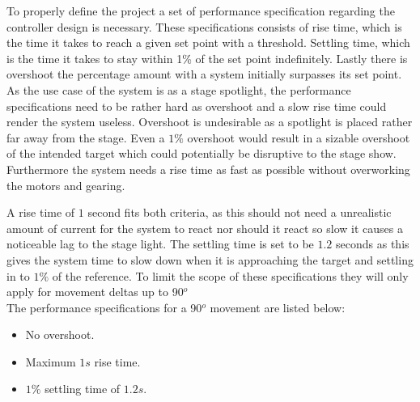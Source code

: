 \documentclass[../../main]{subfiles}
\begin{document}
To properly define the project a set of performance specification regarding the controller design is necessary.
These specifications consists of rise time, which is the time it takes to reach a given set point with a threshold.
Settling time, which is the time it takes to stay within 1\% of the set point indefinitely.
Lastly there is overshoot the percentage amount with a system initially surpasses its set point.\\






As the use case of the system is as a stage spotlight, the performance specifications  need to be rather hard as overshoot and a slow rise time could render the system useless.
Overshoot is undesirable as a spotlight is placed rather far away from the stage. Even a $1\%$ overshoot would result in a sizable overshoot of the intended target which could potentially be disruptive to the stage show.
Furthermore the system needs a rise time as fast as possible without overworking the motors and gearing.

A rise time of $1$ second fits both criteria, as this should not need a unrealistic amount of current for the system to react nor should it react so slow it causes a noticeable lag to the stage light.
The settling time is set to be $1.2$ seconds as this gives the system time to slow down when it is approaching the target and settling in to $1\%$ of the reference.
To limit the scope of these specifications they will only apply for movement deltas up to 90$^o$
\\
The performance specifications for a 90$^o$ movement are listed below:

\begin{itemize}
  \item No overshoot.
  \item Maximum $1s$ rise time.
  \item $1\%$ settling time of $1.2s$.
\end{itemize}
\end{document}
